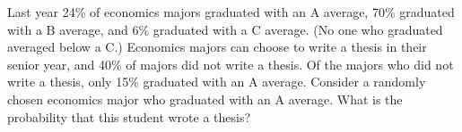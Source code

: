 \documentclass[addpoints,12pt,a4paper]{exam}
\begin{document}
\begin{questions}
\question {}

\newpage


\question Last year 24\% of economics majors graduated with an A average, 70\% graduated with a B average, and 6\% graduated with a C average. (No one who graduated averaged below a C.) Economics majors can choose to write a thesis in their senior year, and 40\% of majors did not write a thesis. Of the majors who did not write a thesis, only 15\% graduated with an A average. Consider a randomly chosen economics major who graduated with an A average. What is the probability that this student wrote a thesis?


\end{questions}
\end{document}
